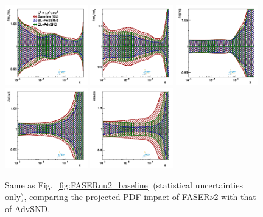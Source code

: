 \begin{figure}[t]
\centering
\includegraphics[width=0.32\textwidth]{plots/proton_fasernu2/FASERv2_vs_AdvSND/statOnly_AdvSND_q2_10000_pdf_uv_ratio.pdf}
\includegraphics[width=0.32\textwidth]{plots/proton_fasernu2/FASERv2_vs_AdvSND/statOnly_AdvSND_q2_10000_pdf_dv_ratio.pdf}
\includegraphics[width=0.32\textwidth]{plots/proton_fasernu2/FASERv2_vs_AdvSND/statOnly_AdvSND_q2_10000_pdf_g_ratio.pdf}\\
\includegraphics[width=0.32\textwidth]{plots/proton_fasernu2/FASERv2_vs_AdvSND/statOnly_AdvSND_q2_10000_pdf_Sea_ratio.pdf}
\includegraphics[width=0.32\textwidth]{plots/proton_fasernu2/FASERv2_vs_AdvSND/statOnly_AdvSND_q2_10000_pdf_s_ratio.pdf}
\caption{
  Same as  Fig.~\ref{fig:FASERnu2_baseline} (statistical uncertainties only), comparing
  the projected PDF impact of FASER$\nu$2 with that of AdvSND.
}
\label{fig:FASERnu2_advsnd}
\end{figure}

